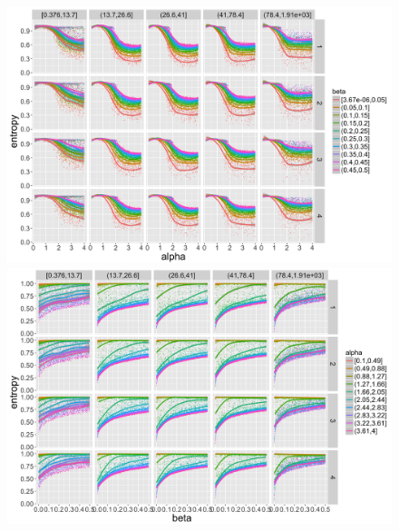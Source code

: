 \begin{figure}
\centering
\includegraphics[width=\textwidth]{figuresraw/entropy_alpha}
\includegraphics[width=\textwidth]{figuresraw/entropy_beta}
\caption{}
\label{}
\end{figure}






